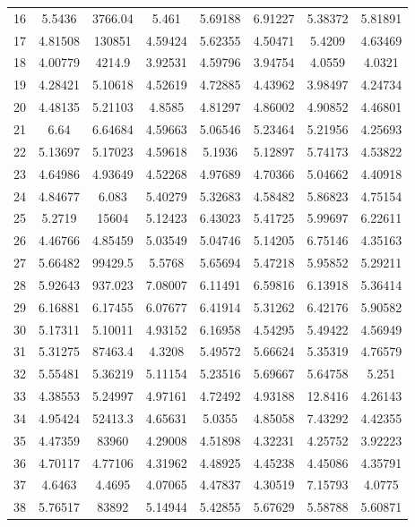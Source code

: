 \begin{center}
\begin{longtable}{cccccccc}
16 & 5.5436 & 3766.04 & 5.461 & 5.69188 & 6.91227 & 5.38372 & 5.81891\\
17 & 4.81508 & 130851 & 4.59424 & 5.62355 & 4.50471 & 5.4209 & 4.63469\\
18 & 4.00779 & 4214.9 & 3.92531 & 4.59796 & 3.94754 & 4.0559 & 4.0321\\
19 & 4.28421 & 5.10618 & 4.52619 & 4.72885 & 4.43962 & 3.98497 & 4.24734\\
20 & 4.48135 & 5.21103 & 4.8585 & 4.81297 & 4.86002 & 4.90852 & 4.46801\\
21 & 6.64 & 6.64684 & 4.59663 & 5.06546 & 5.23464 & 5.21956 & 4.25693\\
22 & 5.13697 & 5.17023 & 4.59618 & 5.1936 & 5.12897 & 5.74173 & 4.53822\\
23 & 4.64986 & 4.93649 & 4.52268 & 4.97689 & 4.70366 & 5.04662 & 4.40918\\
24 & 4.84677 & 6.083 & 5.40279 & 5.32683 & 4.58482 & 5.86823 & 4.75154\\
25 & 5.2719 & 15604 & 5.12423 & 6.43023 & 5.41725 & 5.99697 & 6.22611\\
26 & 4.46766 & 4.85459 & 5.03549 & 5.04746 & 5.14205 & 6.75146 & 4.35163\\
27 & 5.66482 & 99429.5 & 5.5768 & 5.65694 & 5.47218 & 5.95852 & 5.29211\\
28 & 5.92643 & 937.023 & 7.08007 & 6.11491 & 6.59816 & 6.13918 & 5.36414\\
29 & 6.16881 & 6.17455 & 6.07677 & 6.41914 & 5.31262 & 6.42176 & 5.90582\\
30 & 5.17311 & 5.10011 & 4.93152 & 6.16958 & 4.54295 & 5.49422 & 4.56949\\
31 & 5.31275 & 87463.4 & 4.3208 & 5.49572 & 5.66624 & 5.35319 & 4.76579\\
32 & 5.55481 & 5.36219 & 5.11154 & 5.23516 & 5.69667 & 5.64758 & 5.251\\
33 & 4.38553 & 5.24997 & 4.97161 & 4.72492 & 4.93188 & 12.8416 & 4.26143\\
34 & 4.95424 & 52413.3 & 4.65631 & 5.0355 & 4.85058 & 7.43292 & 4.42355\\
35 & 4.47359 & 83960 & 4.29008 & 4.51898 & 4.32231 & 4.25752 & 3.92223\\
36 & 4.70117 & 4.77106 & 4.31962 & 4.48925 & 4.45238 & 4.45086 & 4.35791\\
37 & 4.6463 & 4.4695 & 4.07065 & 4.47837 & 4.30519 & 7.15793 & 4.0775\\
38 & 5.76517 & 83892 & 5.14944 & 5.42855 & 5.67629 & 5.58788 & 5.60871\\

\end{longtable}
\end{center}
